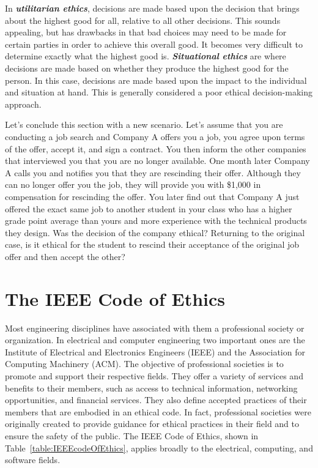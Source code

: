 In \emph{\textbf{utilitarian ethics}}, decisions are made based upon the
decision that brings about the highest good for all, relative to all
other decisions. This sounds appealing, but has drawbacks in that bad
choices may need to be made for certain parties in order to achieve this
overall good. It becomes very difficult to determine exactly what the
highest good is. \emph{\textbf{Situational ethics}} are where decisions
are made based on whether they produce the highest good for the person.
In this case, decisions are made based upon the impact to the individual
and situation at hand. This is generally considered a poor ethical
decision-making approach.

Let's conclude this section with a new scenario. Let's assume that you
are conducting a job search and Company A offers you a job, you agree
upon terms of the offer, accept it, and sign a contract. You then inform
the other companies that interviewed you that you are no longer
available. One month later Company A calls you and notifies you that
they are rescinding their offer. Although they can no longer offer you
the job, they will provide you with \$1,000 in compensation for
rescinding the offer. You later find out that Company A just offered the
exact same job to another student in your class who has a higher grade
point average than yours and more experience with the technical products
they design. Was the decision of the company ethical? Returning to the
original case, is it ethical for the student to rescind their acceptance
of the original job offer and then accept the other?

\section{The IEEE Code of Ethics}
\label{section:the-ieee-code-of-ethics}

Most engineering disciplines have associated with them a professional
society or organization. In electrical and computer engineering two
important ones are the Institute of Electrical and Electronics Engineers
(IEEE) and the Association for Computing Machinery (ACM). The objective
of professional societies is to promote and support their respective
fields. They offer a variety of services and benefits to their members,
such as access to technical information, networking opportunities, and
financial services. They also define accepted practices of their members
that are embodied in an ethical code. In fact, professional societies
were originally created to provide guidance for ethical practices in
their field and to ensure the safety of the public. The IEEE Code of
Ethics, shown in Table~\ref{table:IEEEcodeOfEthics}, 
applies broadly to the electrical,
computing, and software fields.

